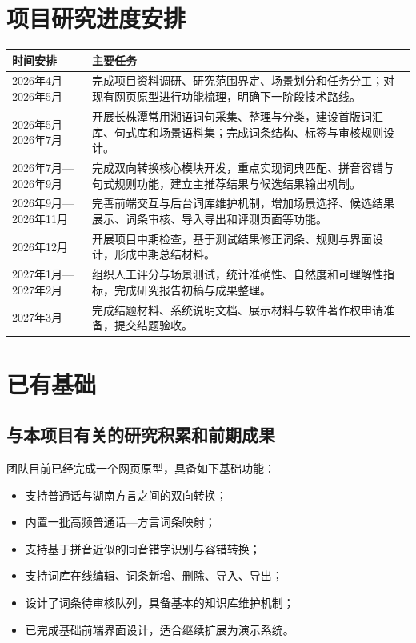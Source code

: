 \documentclass[12pt,a4paper]{ctexart}
\begin{document}
\section{项目研究进度安排}

\begin{longtable}{p{3.2cm}p{10.8cm}}
\toprule
时间安排 & 主要任务 \\
\midrule
2026年4月—2026年5月 & 完成项目资料调研、研究范围界定、场景划分和任务分工；对现有网页原型进行功能梳理，明确下一阶段技术路线。 \\
2026年5月—2026年7月 & 开展长株潭常用湘语词句采集、整理与分类，建设首版词汇库、句式库和场景语料集；完成词条结构、标签与审核规则设计。 \\
2026年7月—2026年9月 & 完成双向转换核心模块开发，重点实现词典匹配、拼音容错与句式规则功能，建立主推荐结果与候选结果输出机制。 \\
2026年9月—2026年11月 & 完善前端交互与后台词库维护机制，增加场景选择、候选结果展示、词条审核、导入导出和评测页面等功能。 \\
2026年12月 & 开展项目中期检查，基于测试结果修正词条、规则与界面设计，形成中期总结材料。 \\
2027年1月—2027年2月 & 组织人工评分与场景测试，统计准确性、自然度和可理解性指标，完成研究报告初稿与成果整理。 \\
2027年3月 & 完成结题材料、系统说明文档、展示材料与软件著作权申请准备，提交结题验收。 \\
\bottomrule
\end{longtable}

\section{已有基础}

\subsection{与本项目有关的研究积累和前期成果}

团队目前已经完成一个网页原型，具备如下基础功能：

\begin{itemize}
  \item 支持普通话与湖南方言之间的双向转换；
  \item 内置一批高频普通话—方言词条映射；
  \item 支持基于拼音近似的同音错字识别与容错转换；
  \item 支持词库在线编辑、词条新增、删除、导入、导出；
  \item 设计了词条待审核队列，具备基本的知识库维护机制；
  \item 已完成基础前端界面设计，适合继续扩展为演示系统。
\end{itemize}
\end{document}
